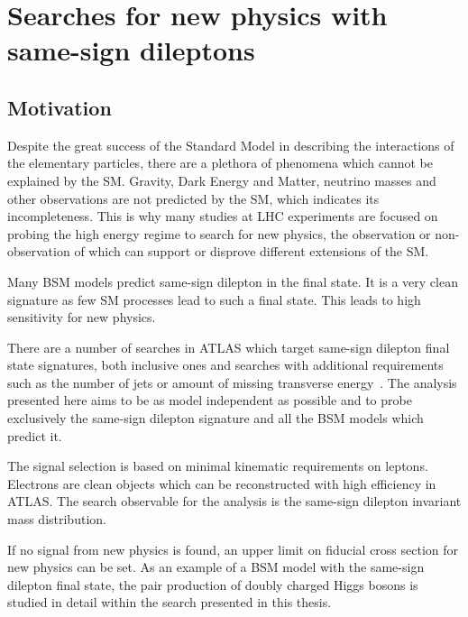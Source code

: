 \chapter{Searches for new physics with same-sign dileptons}
\label{chap:SS}
\section{Motivation}

Despite the great success of the Standard Model in describing the interactions of the elementary particles, there are a plethora of phenomena
which cannot be explained by the SM. Gravity, Dark Energy and Matter, neutrino masses and other observations are not predicted by the
SM, which indicates its incompleteness.
This is why many studies at LHC experiments are focused on probing the high energy regime to search for new physics, 
the observation or non-observation of which can support or disprove different extensions of the SM.

Many BSM models predict same-sign dilepton in the final state.
It is a very clean signature as few SM processes lead to such a final state.
This leads to high sensitivity for new physics.

There are a number of searches in ATLAS which target same-sign dilepton final state signatures, both inclusive ones and searches with additional requirements such as the number of jets or amount of missing transverse energy~\cite{heavy_majorana_neutrino_paper,floderus_paper,Aad:2014pda}.
The analysis presented here aims to be as model independent as possible and to probe exclusively the same-sign dilepton signature and all the BSM models which predict it.

The signal selection is based on minimal kinematic requirements on leptons.
Electrons are clean objects which can be reconstructed with high efficiency in ATLAS.
The search observable for the analysis is the same-sign dilepton invariant mass distribution.

If no signal from new physics is found, an upper limit on fiducial cross section for new physics can be set.
As an example of a BSM model with the same-sign dilepton final state, the pair production of doubly charged Higgs bosons is studied in detail within the search presented in this thesis.

